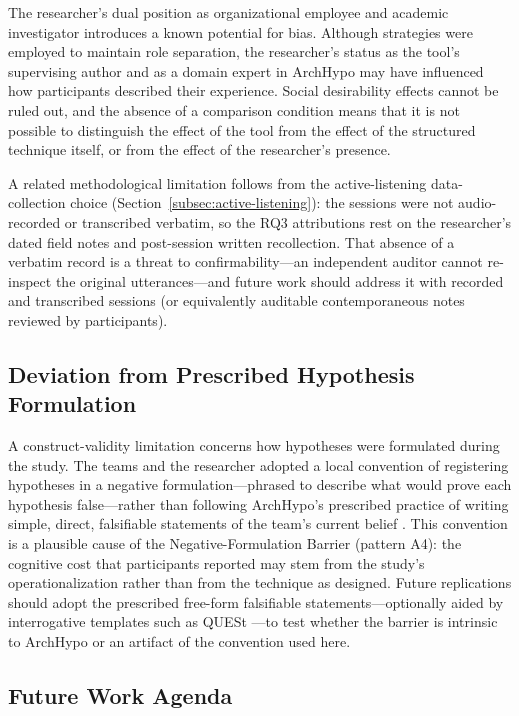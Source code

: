 The researcher's dual position as organizational employee and academic investigator
introduces a known potential for bias. Although strategies were employed to maintain
role separation, the researcher's status as
the tool's supervising author and as a domain expert in ArchHypo may have influenced
how participants described their experience. Social desirability effects cannot be ruled
out, and the absence of a comparison condition means that it is not possible to
distinguish the effect of the tool from the effect of the structured technique itself, or
from the effect of the researcher's presence.

A related methodological limitation follows from the active-listening data-collection
choice (Section~\ref{subsec:active-listening}): the sessions were
not audio-recorded or transcribed verbatim, so the RQ3 attributions rest on the
researcher's dated field notes and post-session written recollection. That absence
of a verbatim record is a threat to confirmability---an independent auditor cannot
re-inspect the original utterances---and future work should address it with
recorded and transcribed sessions (or equivalently auditable contemporaneous
notes reviewed by participants).

\subsection{Deviation from Prescribed Hypothesis Formulation}

A construct-validity limitation concerns how hypotheses were formulated during the
study. The teams and the researcher adopted a local convention of registering
hypotheses in a negative formulation---phrased to describe what would prove each
hypothesis false---rather than following ArchHypo's prescribed practice of writing
simple, direct, falsifiable statements of the team's current belief
\citep{silva2024tse}. This convention is a plausible cause of the
Negative-Formulation Barrier (pattern A4): the cognitive cost that participants
reported may stem from the study's operationalization rather than from the technique
as designed. Future replications should adopt the prescribed free-form falsifiable
statements---optionally aided by interrogative templates such as QUESt
\citep{melegati2019quest}---to test whether the barrier is intrinsic to ArchHypo or
an artifact of the convention used here.

\subsection{Future Work Agenda}

